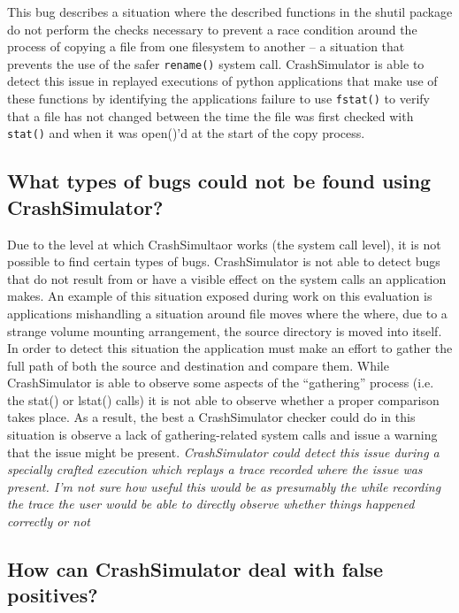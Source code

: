     This bug describes a situation where the described functions in the shutil package do not perform the checks
    necessary to prevent a race condition around the process of copying a file from one filesystem to another --
    a situation that prevents the use of the safer {\tt rename()} system call.  CrashSimulator is able to detect this
    issue in replayed executions of python applications that make use of these functions by identifying the
            applications failure to use {\tt fstat()} to verify that a file has not changed between the time the file was
            first checked with {\tt stat()} and when it was open()'d at the start of the copy process.




\subsection{What types of bugs could not be found using CrashSimulator?}

Due to the level at which CrashSimultaor works (the system call level), it
is not possible to find certain types of bugs.
CrashSimulator is not able to detect bugs that do not result from or have a visible effect on the system calls
an application makes.  An example of this situation exposed during work on this evaluation is applications
mishandling a situation around file moves where the where, due to a strange volume mounting arrangement, the
source directory is moved into itself.  In order to detect this situation the application must make an effort to
gather the full path of both the source and destination and compare them.  While CrashSimulator is able to
observe some aspects of the ``gathering'' process (i.e. the stat() or lstat() calls) it is not able to observe
whether a proper comparison takes place.  As a result, the best a CrashSimulator checker could do in this
situation is observe a lack of gathering-related system calls and issue a warning that the issue might be
present.  \emph{CrashSimulator could detect this issue during a specially crafted execution which replays a
trace recorded where the issue was present.  I'm not sure how useful this would be as presumably the while
recording the trace the user would be able to directly observe whether things happened correctly or not}
        
\subsection{How can CrashSimulator deal with false positives?}

